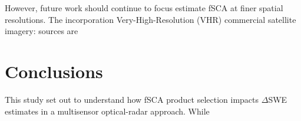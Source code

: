 However, future work should continue to focus estimate fSCA at finer spatial resolutions. The incorporation Very-High-Resolution (VHR) commercial satellite imagery: sources are \citep{huImprovingMountainSnow2022, thalerEstimatingSnowCover2023,yangHighresolutionMappingSnow2023,johnHighResolutionSnowCoveredArea2022}


\hypertarget{ch6-conclusions}{\section{Conclusions}\label{ch6-conclusions}}

This study set out to understand how fSCA product selection impacts $\Delta$SWE estimates in a multisensor optical-radar approach. While 


\clearpage


